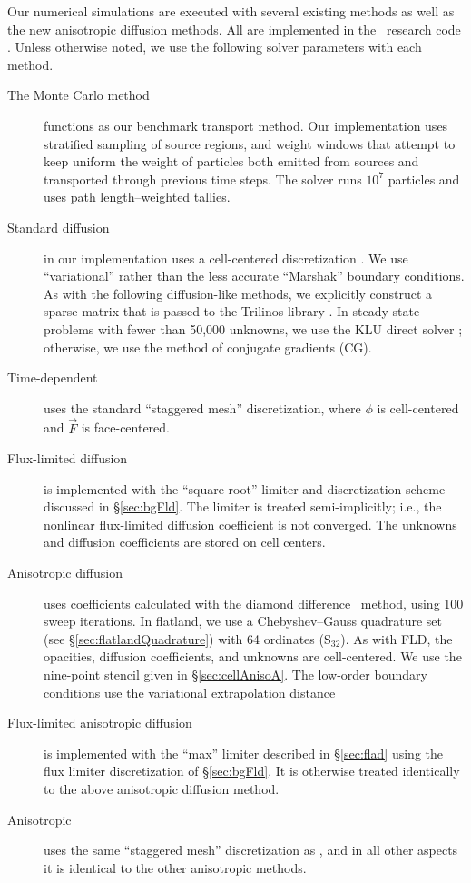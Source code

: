 Our numerical simulations are executed with several existing methods as well
as the new anisotropic diffusion methods. All
are implemented in the \pytrt\ research code \cite{Pytrt}. Unless otherwise
noted, we use the following solver parameters with each method.
\begin{description}
  \item[The Monte Carlo method] functions as our benchmark transport method. Our
    implementation uses stratified sampling of source regions, and weight
    windows that attempt to keep uniform the weight of particles both emitted
    from sources and transported through previous time steps. The solver runs
    $10^7$ particles and uses path length--weighted tallies.

  \item[Standard diffusion] in our implementation uses a cell-centered
    discretization \cite{Dud1976}.  We use ``variational'' rather than the less
    accurate ``Marshak'' boundary conditions.
    As with the following diffusion-like methods, we explicitly
    construct a sparse matrix that is passed to the Trilinos library
    \cite{Her2003}.  In steady-state problems with fewer than 50,000 unknowns,
    we use the KLU direct solver \cite{Her2003}; otherwise, we use the method
    of conjugate gradients (CG).

  \item[Time-dependent \Pone] uses the standard ``staggered mesh''
    discretization, where $\phi$ is cell-centered and $\vec{F}$ is
    face-centered.

  \item[Flux-limited diffusion] is implemented with the ``square root'' limiter
    and discretization scheme discussed in \S\ref{sec:bgFld}. The limiter is
    treated semi-implicitly; i.e., the nonlinear flux-limited diffusion
    coefficient is not converged. The unknowns and diffusion coefficients are
    stored on cell centers.

  \item[Anisotropic diffusion] uses
    coefficients calculated with the diamond difference \SN\ meth\-od, using 100
    sweep iterations. In flatland, we use a Chebyshev--Gauss quadrature set
    (see \S\ref{sec:flatlandQuadrature}) with 64 ordinates (S$_{32}$).
    As with FLD, the opacities, diffusion coefficients, and unknowns are
    cell-centered. We use the nine-point stencil given in
    \S\ref{sec:cellAnisoA}. The low-order boundary conditions use the
    variational extrapolation distance 

  \item[Flux-limited anisotropic diffusion] is implemented with the
    ``max'' limiter described in \S\ref{sec:flad} using the flux limiter
    discretization of \S\ref{sec:bgFld}. It is otherwise treated identically to
    the above anisotropic diffusion method.

  \item[Anisotropic \Pone] uses the same ``staggered mesh'' discretization
    as \Pone, and in all other aspects it is identical to the other anisotropic
    methods.

\end{description}

